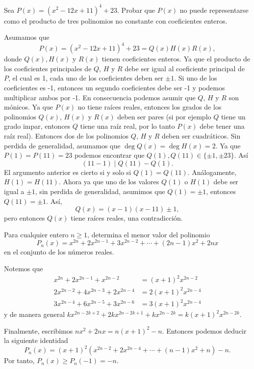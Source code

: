 \begin{example}
    Sea $P(x) = (x^2 - 12x + 11)^4 + 23$.
    Probar que $P(x)$ no puede representarse como el producto de tres polinomios no constante con coeficientes enteros.
\end{example}
\begin{solution}
    Asumamos que
    \[
        P(x) = (x^2 - 12x + 11)^4 + 23 = Q(x) H(x) R(x),
    \]
    donde $Q(x), H(x)$ y $R(x)$ tienen coeficientes enteros.
    Ya que el producto de los coeficientes principales de $Q$, $H$ y $R$ debe ser igual al coeficiente principal de $P$, el cual es 1, cada uno de los coeficientes deben ser $\pm 1$.
    Si uno de los coeficientes es -1, entonces un segundo coeficientes debe ser -1 y podemos multiplicar ambos por -1.
    En consecuencia podemos asumir que $Q$, $H$ y $R$ son mónicos.
    Ya que $P(x)$ no tiene raíces reales, entonces los grados de los polinomios $Q(x)$, $H(x)$ y $R(x)$ deben ser pares (si por ejemplo $Q$ tiene un grado impar, entonces $Q$ tiene una raíz real, por lo tanto $P(x)$ debe tener una raíz real).
    Entonces dos de los polinomios $Q$, $H$ y $R$ deben ser cuadráticos.
    Sin perdida de generalidad, asumamos que $\deg{Q(x)} = \deg{H(x)} = 2$.
    Ya que $P(1) = P(11) = 23$ podemos encontrar que $Q(1), Q(11) \in \{\pm 1, \pm 23\}$.
    Así
    \[
        (11 - 1) \mid Q(11) - Q(1).
    \]
    El argumento anterior es cierto si y solo si $Q(1) = Q(11)$.
    Análogamente, $H(1) = H(11)$.
    Ahora ya que uno de los valores $Q(1)$ o $H(1)$ debe ser igual a $\pm 1$, sin perdida de generalidad, asumimos que $Q(1) = \pm 1$, entonces $Q(11) = \pm 1$.
    Así,
    \[
        Q(x) = (x - 1)(x - 11) \pm 1,
    \]
    pero entonces $Q(x)$ tiene raíces reales, una contradicción.
\end{solution}

\begin{example}
    Para cualquier entero $n \geq 1$, determina el menor valor del polinomio
    \[
        P_n(x) = x^{2n} + 2 x^{2n - 1} + 3x^{2n - 2} + \cdots + (2n - 1)x^2 + 2nx
    \]
    en el conjunto de los números reales.
\end{example}
\begin{solution}
    Notemos que
    \begin{align*}
         x^{2n}     + 2x^{2n - 1} +  x^{2n - 2} &=  (x + 1)^2 x^{2n - 2}\\
        2x^{2n - 2} + 4x^{2n - 3} + 2x^{2n - 4} &= 2(x + 1)^2 x^{2n - 4}\\
        3x^{2n - 4} + 6x^{2n - 5} + 3x^{2n - 6} &= 3(x + 1)^2 x^{2n - 4}
    \end{align*}
    y de manera general $k x^{2n - 2k + 2} + 2k x^{2n - 2k + 1} + k x^{2n - 2k} = k(x + 1)^2 x^{2n - 2k}.$

    Finalmente, escribimos $n x^2 + 2nx = n(x + 1)^2 - n$.
    Entonces podemos deducir la siguiente identidad
    \[
        P_n (x) = (x + 1)^2 \left(x^{2n - 2} + 2x^{2n - 4} + \cdots + (n - 1)x^2 + n\right) - n.
    \]
    Por tanto, $P_n(x) \geq P_n(-1) = -n$.
\end{solution}

